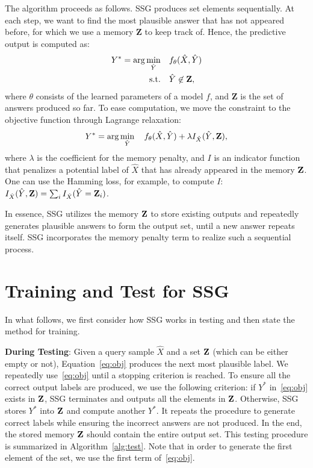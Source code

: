 \documentclass[letterpaper]{article}
\begin{document}
The algorithm proceeds as follows.
SSG produces set elements sequentially. At each step, we want to find the most plausible answer that has not appeared before, for which we use a memory $\mathbf{Z}$ to keep track of. Hence, the predictive output is computed as:
\begin{alignat*}{2}
Y^* = \arg\min_{\hat{Y}} \quad & f_{\theta}(\hat{X},\hat{Y}) \\
  \text{s.t.} \quad &  \begin{aligned}[t]
     \hat{Y} & \not\in {\bf Z},\\
  \end{aligned}
\end{alignat*}
where $\theta$ consists of the learned parameters of a model $f$, and $\mathbf{Z}$ is the set of answers produced so far. To ease computation, we move the constraint to the objective function through Lagrange relaxation:
\begin{equation}
\label{eq:obj}
Y^* = \arg\min_{\hat{Y}}  \quad f_{\theta}(\hat{X},\hat{Y}) + \lambda I_{\hat{X}}(\hat{Y},{\bf Z}),
\end{equation}
where $\lambda$ is the coefficient for the memory penalty, and $I$ is an indicator function that penalizes a potential label of $\hat{X}$ that has already appeared in the memory ${\bf Z}$. One can use the Hamming loss, for example, to compute $I$: $I_{\hat{X}}(\hat{Y},{\bf Z}) = \sum_i I_{\hat{X}}(\hat{Y} = {\bf Z}_i)$.

 In essence, SSG utilizes the memory ${\bf Z}$ to store existing outputs and repeatedly generates plausible answers to form the output set, until a new answer repeats itself. SSG incorporates the memory penalty term to realize such a sequential process.





\section{ Training and Test for SSG}
In what follows, we first consider how SSG works in testing and then state the method for training.

\textbf{During Testing}: Given a query sample $\hat{X}$ and a set ${\bf Z}$ (which can be either empty or not), Equation~\eqref{eq:obj} produces the next most plausible label.  We repeatedly use~\eqref{eq:obj} until a stopping criterion is reached. To ensure all the correct output labels are produced, we use the following criterion: if $Y^*$  in~\eqref{eq:obj} exists in ${\bf Z}$, SSG terminates and outputs all the elements in ${\bf Z}$. Otherwise, SSG stores $Y^*$ into ${\bf Z}$ and compute another $Y^*$. It repeats the procedure to generate correct labels while ensuring the incorrect answers are not produced. In the end, the stored memory ${\bf Z}$ should contain the entire output set. This testing procedure is summarized in Algorithm~\ref{alg:test}. Note that in order to generate the first element of the set, we use the first term of~\eqref{eq:obj}.
\end{document}
